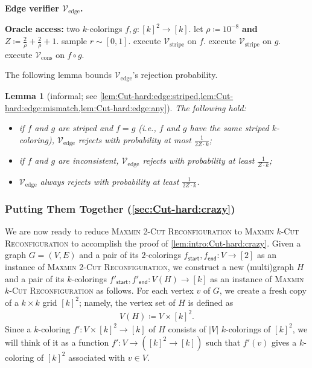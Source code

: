 \documentclass[11pt,fleqn]{article}
\renewcommand{\leq}{\leqslant}
\newcommand{\prb}[1]{\textsc{#1}\xspace}
\newcommand{\defeq}{\coloneq}
\newcommand{\sss}{\mathsf{start}}
\newcommand{\ttt}{\mathsf{end}}
\newcommand{\V}{\calV}
\newcommand{\f}{f}
\newcommand{\g}{g}
\newcommand{\rhozero}{10^{-8}}
\newcommand{\Vstripe}{\V_\mathrm{stripe}}
\newcommand{\Vcons}{\V_\mathrm{cons}}
\newcommand{\Vedge}{\V_\mathrm{edge}}
\newcommand{\MMkCutReconf}{\prb{Maxmin $k$-Cut Reconfiguration}}
\newcommand{\MMtwoCutReconf}{\prb{Maxmin 2-Cut Reconfiguration}}
\newcommand{\calV}{\mathcal{V}}
\newtheorem{lemma}[theorem]{Lemma}
\theoremstyle{definition}
\numberwithin{equation}{section}
\begin{document}
\begin{itembox}[l]{\textbf{Edge verifier $\Vedge$.}}
\begin{algorithmic}[1]
    \item[\textbf{Oracle access:}]
        two $k$-colorings $\f,\g \colon [k]^2 \to [k]$.
    \State let $\rho \defeq \rhozero$ \textbf{and} $Z \defeq \frac{2}{\rho} + \frac{2}{\rho} + 1$.
    \State sample $r \sim [0,1]$.
    \If{$0 \leq r < \frac{2}{\rho Z}$} 
        \State execute $\Vstripe$ on $\f$.
    \ElsIf{$\frac{2}{\rho Z} \leq r < \frac{2}{\rho Z} + \frac{2}{\rho Z}$} 
        \State execute $\Vstripe$ on $\g$.
    \Else {}
        \State execute $\Vcons$ on $\f \circ \g$.
    \EndIf
\end{algorithmic}
\end{itembox}

\noindent
The following lemma bounds $\Vedge$'s rejection probability.

\begin{lemma}[informal; see \cref{lem:Cut-hard:edge:striped,lem:Cut-hard:edge:mismatch,lem:Cut-hard:edge:any}]
\label{lem:intro:Cut-hard:edge}
    The following hold\textup{:}
    \begin{itemize}
        \item if $\f$ and $\g$ are striped and $\f = \g$
            (i.e., $\f$ and $\g$ have the same striped $k$-coloring),
            $\Vedge$ rejects with probability at most $\frac{1}{2Z \cdot k}$\textup{;}
        \item if
            $\f$ and $\g$ are inconsistent,
            $\Vedge$ rejects with probability at least $\frac{1}{Z \cdot k}$\textup{;}
        \item 
            $\Vedge$ always rejects with probability at least $\frac{1}{2Z \cdot k}$.
    \end{itemize}
\end{lemma}\noindent


\subsubsection{Putting Them Together (\cref{sec:Cut-hard:crazy})}
We are now ready to
reduce \MMtwoCutReconf to \MMkCutReconf
to accomplish the proof of \cref{lem:intro:Cut-hard:crazy}.
Given a graph $G=(V,E)$ and a pair of its $2$-colorings $\f_\sss,\f_\ttt \colon V \to [2]$
as an instance of \MMtwoCutReconf,
we construct a new (multi)graph $H$ and a pair of its $k$-colorings $\f'_\sss, \f'_\ttt \colon V(H) \to [k]$
as an instance of \MMkCutReconf as follows.
For each vertex $v$ of $G$, we create a fresh copy of a $k\times k$ grid $[k]^2$; namely,
the vertex set of $H$ is defined as
\begin{align}
    V(H) \defeq V \times [k]^2.
\end{align}
Since a $k$-coloring $\f' \colon V \times [k]^2 \to [k]$ of $H$
consists of $|V|$ $k$-colorings of $[k]^2$,
we will think of it as a function $\f' \colon V \to ([k]^2 \to [k])$ such that
$f'(v)$ gives a $k$-coloring of $[k]^2$ associated with $v \in V$.
\end{document}
